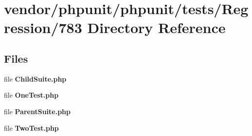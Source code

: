 \section{vendor/phpunit/phpunit/tests/\+Regression/783 Directory Reference}
\label{dir_17832cbbe499fab89211589a90d057b6}
\subsection*{Files}
\begin{DoxyCompactItemize}
\item 
file {\bf Child\+Suite.\+php}
\item 
file {\bf One\+Test.\+php}
\item 
file {\bf Parent\+Suite.\+php}
\item 
file {\bf Two\+Test.\+php}
\end{DoxyCompactItemize}
